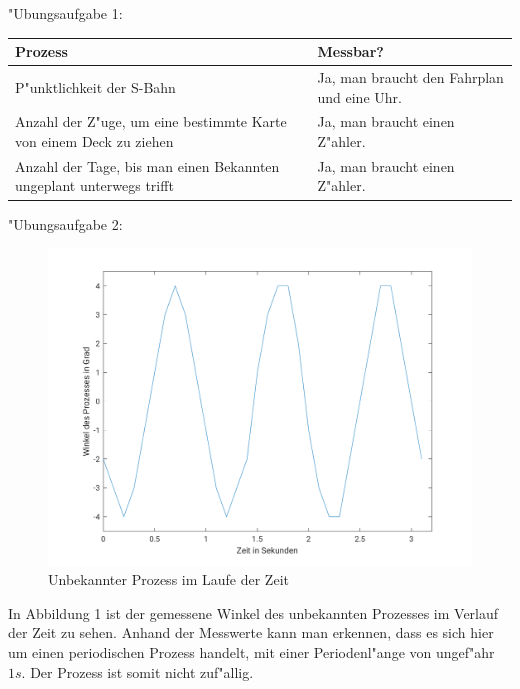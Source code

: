 \documentclass[fleqn,a4paper,12pt]{article}
\begin{document}
"Ubungsaufgabe 1: \newline

\begin{center}
\begin{tabular}{|p{10cm}|p{5cm}|}
	\hline \textbf{Prozess} & \textbf{Messbar?} \\
	\hline P"unktlichkeit der S-Bahn & Ja, man braucht den Fahrplan und eine Uhr. \\
	\hline Anzahl der Z"uge, um eine bestimmte Karte von einem Deck zu ziehen & Ja, man braucht einen Z"ahler. \\
	\hline Anzahl der Tage, bis man einen Bekannten ungeplant unterwegs trifft & Ja, man braucht einen Z"ahler. \\
	\hline
\end{tabular}
\end{center}

"Ubungsaufgabe 2: \newline

\begin{figure}[h]
\caption{Unbekannter Prozess im Laufe der Zeit}
\centering
\includegraphics[width=1.0\textwidth]{unbekannterprozess}
\end{figure}

In Abbildung 1 ist der gemessene Winkel des unbekannten Prozesses im Verlauf der Zeit zu sehen. Anhand der Messwerte kann man erkennen, dass es sich hier um einen periodischen Prozess handelt, mit einer Periodenl"ange von ungef"ahr $1s$. Der Prozess ist somit nicht zuf"allig.
\end{document}

